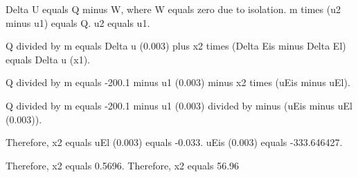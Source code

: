 Delta U equals Q minus W, where W equals zero due to isolation.  
m times (u2 minus u1) equals Q.  
u2 equals u1.  

Q divided by m equals Delta u (0.003) plus x2 times (Delta Eis minus Delta El) equals Delta u (x1).  

Q divided by m equals -200.1 minus u1 (0.003) minus x2 times (uEis minus uEl).  

Q divided by m equals -200.1 minus u1 (0.003) divided by minus (uEis minus uEl (0.003)).  

Therefore, x2 equals uEl (0.003) equals -0.033.  
uEis (0.003) equals -333.646427.  

Therefore, x2 equals 0.5696.  
Therefore, x2 equals 56.96%